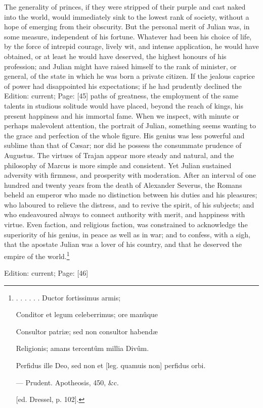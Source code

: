 The generality of princes, if they were stripped of their purple and cast naked into the world, would immediately sink to the lowest rank of society, without a hope of emerging from their obscurity. But the personal merit of Julian was, in some measure, independent of his fortune. Whatever had been his choice of life, by the force of intrepid courage, lively wit, and intense application, he would have obtained, or at least he would have deserved, the highest honours of his profession; and Julian might have raised himself to the rank of minister, or general, of the state in which he was born a private citizen. If the jealous caprice of power had disappointed his expectations; if he had prudently declined the Edition: current; Page: [45] paths of greatness, the employment of the same talents in studious solitude would have placed, beyond the reach of kings, his present happiness and his immortal fame. When we inspect, with minute or perhaps malevolent attention, the portrait of Julian, something seems wanting to the grace and perfection of the whole figure. His genius was less powerful and sublime than that of Cæsar; nor did he possess the consummate prudence of Augustus. The virtues of Trajan appear more steady and natural, and the philosophy of Marcus is more simple and consistent. Yet Julian sustained adversity with firmness, and prosperity with moderation. After an interval of one hundred and twenty years from the death of Alexander Severus, the Romans beheld an emperor who made no distinction between his duties and his pleasures; who laboured to relieve the distress, and to revive the spirit, of his subjects; and who endeavoured always to connect authority with merit, and happiness with virtue. Even faction, and religious faction, was constrained to acknowledge the superiority of his genius, in peace as well as in war; and to confess, with a sigh, that the apostate Julian was a lover of his country, and that he deserved the empire of the world.\footnote{. . . . . . Ductor fortissimus armis;

Conditor et legum celeberrimus; ore manûque

Consultor patriæ; sed non consultor habendæ

Religionis; amans tercentûm millia Divûm.

Perfidus ille Deo, sed non et [leg. quamuis non] perfidus orbi.

\texthebrew{—} Prudent. Apotheosis, 450, \&c.

[ed. Dressel, p. 102].}

Edition: current; Page: [46]

